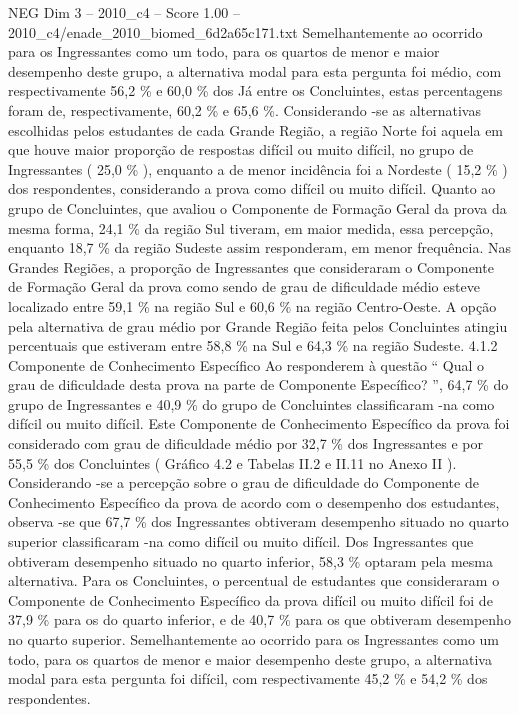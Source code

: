 \begin{textsample}{NEG Dim 3 – 2010\_c4 – Score 1.00 – 2010\_c4/enade\_2010\_biomed\_6d2a65c171.txt}
Semelhantemente ao ocorrido para os Ingressantes como um todo, para os quartos de menor e maior desempenho deste grupo, a alternativa modal para esta pergunta foi médio, com respectivamente 56,2 \% e 60,0 \% dos Já entre os Concluintes, estas percentagens foram de, respectivamente, 60,2 \% e 65,6 \%.
Considerando -se as alternativas escolhidas pelos estudantes de cada Grande Região, a região Norte foi aquela em que houve maior proporção de respostas difícil ou muito difícil, no grupo de Ingressantes ( 25,0 \% ), enquanto a de menor incidência foi a Nordeste ( 15,2 \% ) dos respondentes, considerando a prova como difícil ou muito difícil.
Quanto ao grupo de Concluintes, que avaliou o Componente de Formação Geral da prova da mesma forma, 24,1 \% da região Sul tiveram, em maior medida, essa percepção, enquanto 18,7 \% da região Sudeste assim responderam, em menor frequência.
Nas Grandes Regiões, a proporção de Ingressantes que consideraram o Componente de Formação Geral da prova como sendo de grau de dificuldade médio esteve localizado entre 59,1 \% na região Sul e 60,6 \% na região Centro-Oeste.
A opção pela alternativa de grau médio por Grande Região feita pelos Concluintes atingiu percentuais que estiveram entre 58,8 \% na Sul e 64,3 \% na região Sudeste. 4.1.2 Componente de Conhecimento Específico Ao responderem à questão “ Qual o grau de dificuldade desta prova na parte de Componente Específico? ”, 64,7 \% do grupo de Ingressantes e 40,9 \% do grupo de Concluintes classificaram -na como difícil ou muito difícil.
Este Componente de Conhecimento Específico da prova foi considerado com grau de dificuldade médio por 32,7 \% dos Ingressantes e por 55,5 \% dos Concluintes ( Gráfico 4.2 e Tabelas II.2 e II.11 no Anexo II ).
Considerando -se a percepção sobre o grau de dificuldade do Componente de Conhecimento Específico da prova de acordo com o desempenho dos estudantes, observa -se que 67,7 \% dos Ingressantes obtiveram desempenho situado no quarto superior classificaram -na como difícil ou muito difícil.
Dos Ingressantes que obtiveram desempenho situado no quarto inferior, 58,3 \% optaram pela mesma alternativa.
Para os Concluintes, o percentual de estudantes que consideraram o Componente de Conhecimento Específico da prova difícil ou muito difícil foi de 37,9 \% para os do quarto inferior, e de 40,7 \% para os que obtiveram desempenho no quarto superior.
Semelhantemente ao ocorrido para os Ingressantes como um todo, para os quartos de menor e maior desempenho deste grupo, a alternativa modal para esta pergunta foi difícil, com respectivamente 45,2 \% e 54,2 \% dos respondentes.

\end{textsample}
